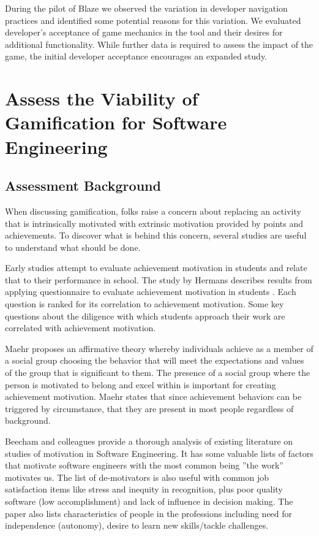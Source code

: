 \documentclass{sig-alternate}
\begin{document}
During the pilot of Blaze we observed the variation in developer navigation practices and identified some potential reasons for this variation.  We evaluated developer's acceptance of game mechanics in the tool and their desires for additional functionality.  While further data is required to assess the impact of the game, the initial developer acceptance encourages an expanded study.



\section{Assess the Viability of Gamification for Software Engineering}

\subsection{Assessment Background}
When discussing gamification, folks raise a concern about replacing an activity that is intrinsically motivated with extrinsic motivation provided by points and achievements.  To discover what is behind this concern, several studies are useful to understand what should be done. 

Early studies attempt to evaluate achievement motivation in students and relate that to their performance in school.  The study by Hermans describes results from applying questionnaire to evaluate achievement motivation in students \cite{wbsnipes:Hermans1970Questionnaire}.  Each question is ranked for its correlation to achievement motivation. Some key questions about the diligence with which students approach their work are correlated with achievement motivation.  

Maehr proposes an affirmative theory whereby  individuals achieve as a member of a social group choosing the behavior that will meet the expectations and values of the group that is significant to them. \cite{wbsnipes:MaehrCulture}  The presence of a social group where the person is motivated to belong and excel within is important for creating achievement motivation.  Maehr states that since achievement behaviors can be triggered by circumstance, that they are present in most people regardless of background. 

Beecham and colleagues provide a thorough analysis of existing literature on studies of motivation in Software Engineering\cite{wbsnipes:Beecham2008Motivation}. It has some valuable lists of factors that motivate software engineers with the most common being ''the work'' motivates us. The list of de-motivators is also useful with common job satisfaction items like stress and inequity in recognition, plus poor quality software (low accomplishment) and lack of influence in decision making. The paper also lists characteristics of people in the professions including need for independence (autonomy), desire to learn new skills/tackle challenges. 
\end{document}

